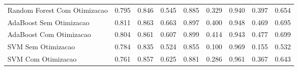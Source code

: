 \begin{table}[H]
\begin{adjustwidth}{ -1in }{ -1in }
\begin{tabular}{lrrrrrrrr}
      Random Forest Com Otimizacao &                        0.795 &                         0.846 &                            0.545 &                            0.885 &                          0.329 &                          0.940 &                                     0.397 &                                 0.654 \\
           AdaBoost Sem Otimizacao &                        0.811 &                         0.863 &                            0.663 &                            0.897 &                          0.400 &                          0.948 &                                     0.469 &                                 0.695 \\
           AdaBoost Com Otimizacao &                        0.804 &                         0.861 &                            0.607 &                            0.899 &                          0.414 &                          0.943 &                                     0.477 &                                 0.699 \\
                SVM Sem Otimizacao &                        0.784 &                         0.835 &                            0.524 &                            0.855 &                          0.100 &                          0.969 &                                     0.155 &                                 0.532 \\
                SVM Com Otimizacao &                        0.761 &                         0.857 &                            0.625 &                            0.881 &                          0.286 &                          0.961 &                                     0.367 &                                 0.643 \\
\bottomrule
\end{tabular}
    \end{adjustwidth}
    \renewcommand{\arraystretch}{1.0} %
\end{table}
